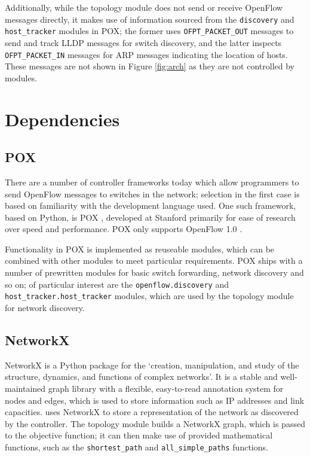 Additionally, while the topology module does not send or receive OpenFlow messages directly, it makes use of information sourced from the \texttt{discovery} and \texttt{host\_tracker} modules in POX; the former uses \texttt{OFPT\_PACKET\_OUT} messages to send and track LLDP messages for switch discovery, and the latter inspects \texttt{OFPT\_PACKET\_IN} messages for ARP messages indicating the location of hosts. These messages are not shown in Figure \ref{fig:arch} as they are not controlled by \thesis{} modules.

\section{Dependencies}
\subsection{POX}
There are a number of controller frameworks today which allow programmers to send OpenFlow messages to switches in the network; selection in the first case is based on familiarity with the development language used. One such framework, based on Python, is POX \cite{onl:pox}, developed at Stanford primarily for ease of research over speed and performance. POX only supports OpenFlow 1.0 \cite{onf:switch100}.

Functionality in POX is implemented as reuseable modules, which can be combined with other modules to meet particular requirements. POX ships with a number of prewritten modules for basic switch forwarding, network discovery and so on; of particular interest are the \texttt{openflow.discovery} and \texttt{host\_tracker.host\_tracker} modules, which are used by the \thesis{} topology module for network discovery.

\subsection{NetworkX}
NetworkX is a Python package for the `creation, manipulation, and study of the structure, dynamics, and functions of complex networks'. It is a stable and well-maintained graph library with a flexible, easy-to-read annotation system for nodes and edges, which is used to store information such as IP addresses and link capacities. \thesis{} uses NetworkX to store a representation of the network as discovered by the controller. The topology module builds a NetworkX graph, which is passed to the objective function; it can then make use of provided mathematical functions, such as the \texttt{shortest\_path} and \texttt{all\_simple\_paths} functions.

